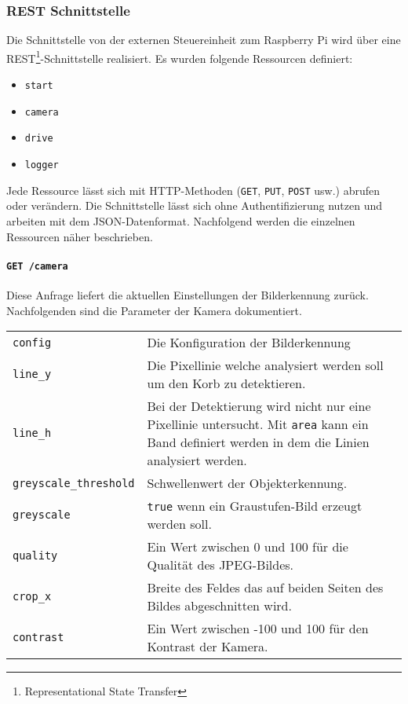 \subsubsection{REST Schnittstelle}
\label{sec:rest-schnittstelle}

Die Schnittstelle von der externen Steuereinheit zum Raspberry Pi wird über eine REST\footnote{Representational State Transfer}-Schnittstelle realisiert. Es wurden folgende Ressourcen definiert:
\begin{itemize}
	\item \texttt{start}
	\item \texttt{camera}
	\item \texttt{drive}
	\item \texttt{logger}
\end{itemize}
Jede Ressource lässt sich mit HTTP-Methoden (\texttt{GET}, \texttt{PUT}, \texttt{POST} usw.) abrufen oder verändern. Die Schnittstelle lässt sich ohne Authentifizierung nutzen und arbeiten mit dem JSON-Datenformat. Nachfolgend werden die einzelnen Ressourcen näher beschrieben.

\paragraph{\texttt{GET /camera}}

Diese Anfrage liefert die aktuellen Einstellungen der Bilderkennung zurück. Nachfolgenden sind die Parameter der Kamera dokumentiert.
\label{tab:parameter-bilderkennung}
\begin{table}[h!]
	\begin{tabular}{l p{16cm}}
		\texttt{config} & Die Konfiguration der Bilderkennung \\
		\texttt{line\_y} & Die Pixellinie welche analysiert werden soll um den Korb zu detektieren. \\
		\texttt{line\_h} & Bei der Detektierung wird nicht nur eine Pixellinie untersucht. Mit \texttt{area} kann ein Band definiert werden in dem die Linien analysiert werden. \\
		\texttt{greyscale\_threshold} & Schwellenwert der Objekterkennung. \\
		\texttt{greyscale} & \texttt{true} wenn ein Graustufen-Bild erzeugt werden soll. \\
		\texttt{quality} & Ein Wert zwischen 0 und 100 für die Qualität des JPEG-Bildes. \\
		\texttt{crop\_x} & Breite des Feldes das auf beiden Seiten des Bildes abgeschnitten wird. \\
		\texttt{contrast} & Ein Wert zwischen -100 und 100 für den Kontrast der Kamera. \\
	\end{tabular}
	
\end{table}

